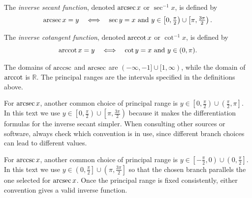 \begin{definition}
The \emph{inverse secant function}, denoted \(\arcsec x\) or \(\sec^{-1} x\), is defined by
\[
\arcsec x = y \quad \Longleftrightarrow \quad \sec y = x \text{ and } y \in \left[0, \tfrac{\pi}{2}\right) \cup \left[\pi, \tfrac{3\pi}{2}\right).
\]
\end{definition}

\begin{definition}
The \emph{inverse cotangent function}, denoted \(\arccot x\) or \(\cot^{-1} x\), is defined by
\[
\arccot x = y \quad \Longleftrightarrow \quad \cot y = x \text{ and } y \in (0, \pi).
\]
\end{definition}

The domains of \(\arccsc\) and \(\arcsec\) are \((-\infty, -1] \cup [1, \infty)\), while the domain of \(\arccot\) is \(\mathbb{R}\). The principal ranges are the intervals specified in the definitions above.

\begin{remark}
For \(\arcsec x\), another common choice of principal range is \(y \in \left[0, \tfrac{\pi}{2}\right) \cup \left(\tfrac{\pi}{2}, \pi\right]\). In this text we use \(y \in \left[0, \tfrac{\pi}{2}\right) \cup \left[\pi, \tfrac{3\pi}{2}\right)\) because it makes the differentiation formulas for the inverse secant simpler. When consulting other sources or software, always check which convention is in use, since different branch choices can lead to different values.
\end{remark}

\begin{remark}
For \(\arccsc x\), another common choice of principal range is \(y \in \left[-\tfrac{\pi}{2}, 0\right) \cup \left(0, \tfrac{\pi}{2}\right]\). In this text we use \(y \in \left(0, \tfrac{\pi}{2}\right] \cup \left(\pi, \tfrac{3\pi}{2}\right]\) so that the chosen branch parallels the one selected for \(\arcsec x\). Once the principal range is fixed consistently, either convention gives a valid inverse function.
\end{remark}


